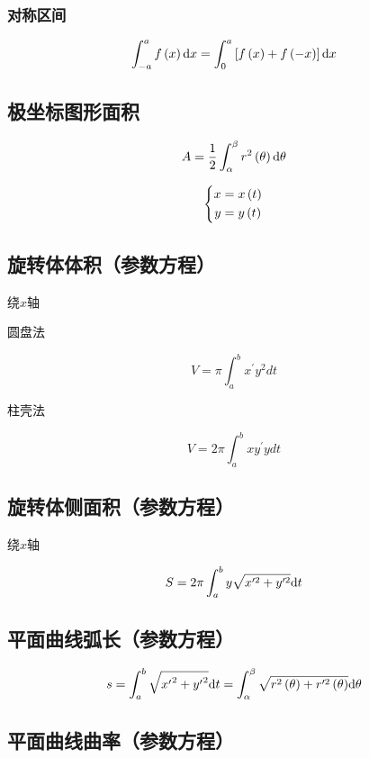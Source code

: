 \documentclass{article}
\begin{document}
\subsubsection{对称区间}

\[\int_{-a}^af\left(x\right)\mathrm d x=\int_0^a\left[f\left(x\right)+f\left(-x\right)\right]\mathrm d x\]

\subsection{极坐标图形面积}

\[A=\frac12\int_{\alpha}^{\beta}{r^2\left(\theta\right)\mathrm d\theta}\]

\begin{definition}
    \[\left\{\begin{aligned}
            x & =x\left(t\right) \\
            y & =y\left(t\right)
        \end{aligned}\right.\]
\end{definition}

\subsection{旋转体体积（参数方程）}

绕$x$轴

圆盘法

\[V=\pi\int_a^bx^\prime y^2dt\]

柱壳法

\[V=2\pi\int_a^bxy^\prime ydt\]

\subsection{旋转体侧面积（参数方程）}

绕$x$轴

\[S=2\pi\int_a^b{y\sqrt{x^{\prime2}+y^{\prime2}}\mathrm d t}\]

\subsection{平面曲线弧长（参数方程）}

\[s=\int_a^b{\sqrt{{x^\prime}^2+{y^\prime}^2}\mathrm d t}=\int_{\alpha}^{\beta}{\sqrt{r^2\left(\theta\right)+r^{\prime2}\left(\theta\right)}\mathrm d\theta}\]

\subsection{平面曲线曲率（参数方程）}
\end{document}
